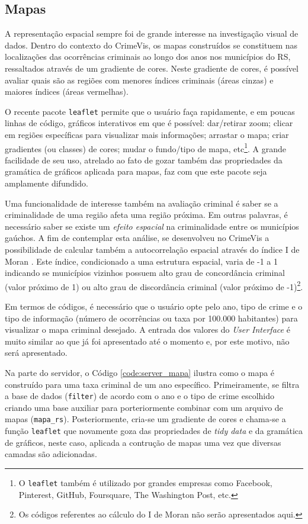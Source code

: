 \documentclass[12pt,openright,oneside,a4paper,english,french,spanish]{abntex2}
\numberwithin{table}{section} %
\numberwithin{figure}{section} %
\begin{document}
\subsection{Mapas\label{sec:mapa}}

A representação espacial sempre foi de grande interesse na investigação visual de dados. Dentro do contexto do CrimeVis, os mapas construídos se constituem nas localizações das ocorrências criminais ao longo dos anos nos municípios do RS, ressaltados através de um gradiente de cores. Neste gradiente de cores, é possível avaliar quais são as regiões com menores índices criminais (áreas cinzas) e maiores índices (áreas vermelhas).

O recente pacote \texttt{leaflet} permite que o usuário faça rapidamente, e em poucas linhas de código, gráficos interativos em que é possível: dar/retirar zoom; clicar em regiões específicas para visualizar mais informações; arrastar o mapa; criar gradientes (ou classes) de cores; mudar o fundo/tipo de mapa, etc\footnote{O \texttt{leaflet} também é utilizado por grandes empresas como Facebook, Pinterest, GitHub, Foursquare, The Washington Post, etc.}. A grande facilidade de seu uso, atrelado ao fato de gozar também das propriedades da gramática de gráficos aplicada para mapas, faz com que este pacote seja amplamente difundido.

Uma funcionalidade de interesse também na avaliação criminal é saber se a criminalidade de uma região afeta uma região próxima. Em outras palavras, é necessário saber se existe um \textit{efeito espacial} na criminalidade entre os municípios gaúchos. A fim de contemplar esta análise, se desenvolveu no CrimeVis a possibilidade de calcular também a autocorrelação espacial através do índice I de Moran \cite{moran1950biometrika}. Este índice, condicionado a uma estrutura espacial, varia de -1 a 1 indicando se municípios vizinhos possuem alto grau de concordância criminal (valor próximo de 1) ou alto grau de discordância criminal (valor próximo de -1)\footnote{Os códigos referentes ao cálculo do I de Moran não serão apresentados aqui.}.

Em termos de códigos, é necessário que o usuário opte pelo ano, tipo de crime e o tipo de informação (número de ocorrências ou taxa por 100.000 habitantes) para visualizar o mapa criminal desejado. A entrada dos valores do \textit{User Interface} é muito similar ao que já foi apresentado até o momento e, por este motivo, não será apresentado.

Na parte do servidor, o Código \ref{code:server_mapa} ilustra como o mapa é construído para uma taxa criminal de um ano específico. Primeiramente, se filtra a base de dados (\texttt{filter}) de acordo com o ano e o tipo de crime escolhido criando uma base auxiliar para porteriormente combinar com um arquivo de mapas (\texttt{mapa\_rs}). Posteriormente, cria-se um gradiente de cores e chama-se a função \texttt{leaflet} que novamente goza das propriedades de \textit{tidy data} e da gramática de gráficos, neste caso, aplicada a contrução de mapas uma vez que diversas camadas são adicionadas.
\end{document}
